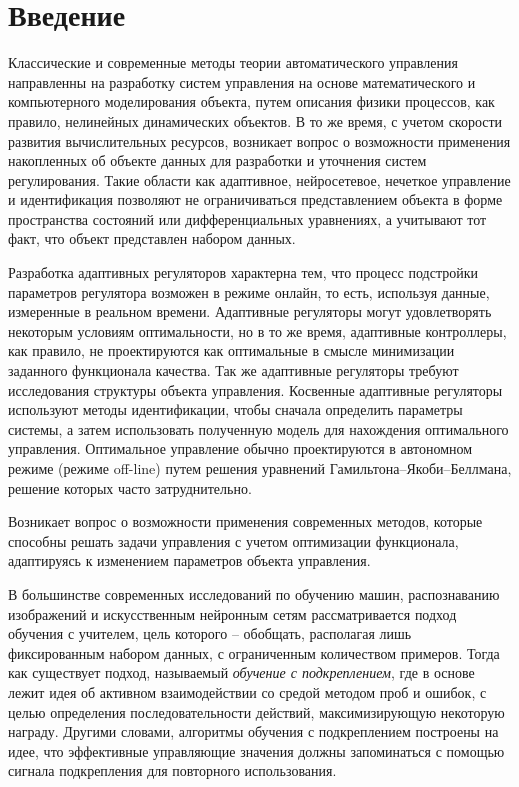 \chapter*{Введение} %
Классические и современные методы теории автоматического управления направленны на разработку систем управления на основе математического и компьютерного моделирования объекта, путем описания физики процессов, как правило, нелинейных динамических объектов. В то же время, с учетом скорости развития вычислительных ресурсов, возникает вопрос о возможности применения накопленных об объекте данных для разработки и уточнения систем регулирования.
Такие области как адаптивное, нейросетевое, нечеткое управление и идентификация позволяют не ограничиваться представлением объекта в форме пространства состояний или дифференциальных уравнениях, а учитывают тот факт, что объект представлен набором данных. 

Разработка адаптивных регуляторов характерна тем, что процесс подстройки параметров регулятора возможен в режиме онлайн, то есть, используя данные, измеренные в реальном времени. Адаптивные регуляторы могут удовлетворять некоторым условиям оптимальности, но в то же время, адаптивные контроллеры, как правило, не проектируются как оптимальные в смысле минимизации заданного функционала качества. Так же адаптивные регуляторы требуют исследования структуры объекта управления. Косвенные адаптивные регуляторы используют методы идентификации, чтобы сначала определить параметры системы, а затем использовать полученную модель для нахождения оптимального управления. 
Оптимальное управление обычно проектируются в автономном режиме (режиме off-line) путем решения уравнений Гамильтона–Якоби–Беллмана, решение которых часто затруднительно.

Возникает вопрос о возможности применения современных методов, которые способны решать задачи управления с учетом оптимизации функционала, адаптируясь к изменением параметров объекта управления.

В большинстве современных исследований по обучению машин, распознаванию изображений и искусственным нейронным сетям рассматривается подход обучения с учителем, цель которого -- обобщать, располагая лишь фиксированным набором данных, с ограниченным количеством примеров. Тогда как существует подход, называемый \textit{обучение с подкреплением}, где в основе лежит идея об активном взаимодействии со средой методом проб и ошибок, с целью определения последовательности действий, максимизирующую некоторую награду. Другими словами, алгоритмы обучения с подкреплением построены на идее, что эффективные управляющие значения должны запоминаться с помощью сигнала подкрепления для повторного использования.

